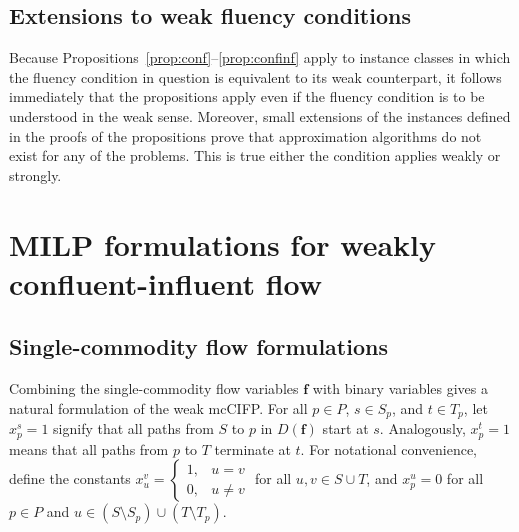\documentclass[pdflatex,sn-mathphys-num]{sn-jnl}%
\theoremstyle{thmstyleone}%
\newtheorem{corollary}[theorem]{Corollary}%
\begin{document}
\subsection{Extensions to weak fluency conditions} \label{sec:wcompl}
Because Propositions~\ref{prop:conf}--\ref{prop:confinf} apply to instance classes in which the fluency condition in question is equivalent to its
weak counterpart, it follows immediately that the propositions apply even if the fluency condition is to be understood in the weak sense.
Moreover, small extensions of the instances defined in the proofs of the propositions prove that approximation algorithms do not exist for any of the problems.
This is true either the condition applies weakly or strongly.

% 

\section{MILP formulations for weakly confluent-influent flow} \label{sec:wciMILP}

\subsection{Single-commodity flow formulations} \label{sec:sciMILP}
Combining the single-commodity flow variables $\boldsymbol{f}$ with binary variables gives a natural formulation of the weak mcCIFP.
For all $p\in P$, $s\in S_p$, and $t\in T_p$, let $x_p^s=1$ signify that all paths from $S$ to $p$ in $D(\boldsymbol{f})$ start at $s$.
Analogously, $x_p^t=1$ means that all paths from $p$ to $T$ terminate at $t$.
For notational convenience, define the constants $x_u^v=\left\{\begin{array}{lr}1, & u=v \\ 0, & u\neq v\end{array}\right.$
for all $u,v\in S\cup T$, and $x_p^u=0$ for all $p\in P$ and $u\in (S\setminus S_p)\cup(T\setminus T_p)$.
\end{document}

